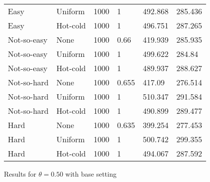 \documentclass[11pt,a4paper,draft]{article}
\begin{document}
\begin{figure}[!htb]
\begin{tabular}{llllll}
		Easy & Uniform & 1000 & 1 & 492.868 & 285.436 \\
		Easy & Hot-cold & 1000 & 1 & 496.751 & 287.265 \\ \hline
		Not-so-easy & None & 1000 & 0.66 & 419.939 & 285.935 \\
		Not-so-easy & Uniform & 1000 & 1 & 499.622 & 284.84 \\
		Not-so-easy & Hot-cold & 1000 & 1 & 489.937 & 288.627 \\ \hline
		Not-so-hard & None & 1000 & 0.655 & 417.09 & 276.514 \\
		Not-so-hard & Uniform & 1000 & 1 & 510.347 & 291.584 \\
		Not-so-hard & Hot-cold & 1000 & 1 & 490.899 & 289.477 \\ \hline
		Hard & None & 1000 & 0.635 & 399.254 & 277.453 \\
		Hard & Uniform & 1000 & 1 & 500.742 & 299.355 \\
		Hard & Hot-cold & 1000 & 1 & 494.067 & 287.592 \\ \hline\hline
	\end{tabular}
\caption{Results for $\theta = 0.50$ with base setting}
\end{figure}
\end{document}
